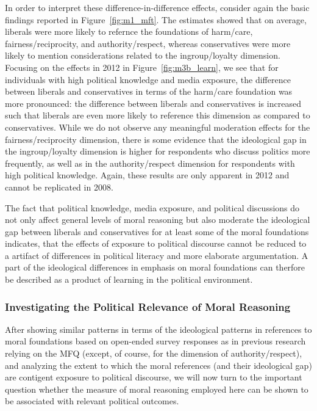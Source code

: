 \documentclass[12pt]{article}
\begin{document}
In order to interpret these difference-in-difference effects, consider again the basic findings reported in Figure~\ref{fig:m1_mft}. The estimates showed that on average, liberals were more likely to refernce the foundations of harm/care, fairness/reciprocity, and authority/respect, whereas conservatives were more likely to mention considerations related to the ingroup/loyalty dimension. Focusing on the effects in 2012 in Figure~\ref{fig:m3b_learn}, we see that for individuals with high political knowledge and media exposure, the difference between liberals and conservatives in terms of the harm/care foundation was more pronounced: the difference between liberals and conservatives is increased such that liberals are even more likely to reference this dimension as compared to conservatives. While we do not observe any meaningful moderation effects for the fairness/reciprocity dimension, there is some evidence that the ideological gap in the ingroup/loyalty dimension is higher for respondents who discuss politics more frequently, as well as in the authority/respect dimension for respondents with high political knowledge. Again, these results are only apparent in 2012 and cannot be replicated in 2008.

The fact that political knowledge, media exposure, and political discussions do not only affect general levels of moral reasoning but also moderate the ideological gap between liberals and conservatives for at least some of the moral foundations indicates, that the effects of exposure to political discourse cannot be reduced to a artifact of differences in political literacy and more elaborate argumentation. A part of the ideological differences in emphasis on moral foundations can therfore be described as a product of learning in the political environment.


\subsubsection{Investigating the Political Relevance of Moral Reasoning}

After showing similar patterns in terms of the ideological patterns in references to moral foundations based on open-ended survey responses as in previous research relying on the MFQ (except, of course, for the dimension of authority/respect), and analyzing the extent to which the moral references (and their ideological gap) are contigent exposure to political discourse, we will now turn to the important question whether the measure of moral reasoning employed here can be shown to be associated with relevant political outcomes.
\end{document}
